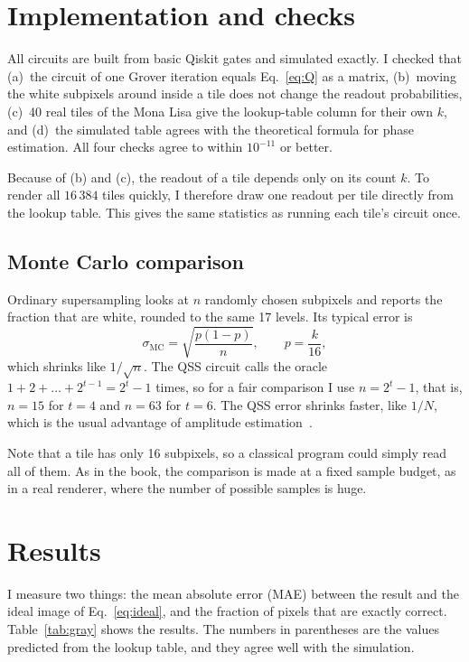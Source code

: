 \documentclass[10pt,twocolumn,a4paper]{article}
\begin{document}
\section{Implementation and checks}\label{sec:impl}

All circuits are built from basic Qiskit gates and simulated exactly.
I checked that
(a)~the circuit of one Grover iteration equals Eq.~\eqref{eq:Q} as a matrix,
(b)~moving the white subpixels around inside a tile does not change the
readout probabilities,
(c)~40 real tiles of the Mona Lisa give the lookup-table column for their own
$k$, and
(d)~the simulated table agrees with the theoretical formula for phase
estimation.
All four checks agree to within $10^{-11}$ or better.

Because of (b) and (c), the readout of a tile depends only on its count $k$.
To render all $16\,384$ tiles quickly, I therefore draw one readout per tile
directly from the lookup table. This gives the same statistics as running each
tile's circuit once.

\subsection{Monte Carlo comparison}
Ordinary supersampling looks at $n$ randomly chosen subpixels and reports the
fraction that are white, rounded to the same 17 levels. Its typical error is
\begin{equation}
\sigma_{\mathrm{MC}}=\sqrt{\frac{p(1-p)}{n}},\qquad p=\frac{k}{16},
\label{eq:mc}
\end{equation}
which shrinks like $1/\sqrt n$. The QSS circuit calls the oracle
$1+2+\dots+2^{t-1}=2^t-1$ times, so for a fair comparison I use $n=2^t-1$, that
is, $n=15$ for $t=4$ and $n=63$ for $t=6$. The QSS error shrinks faster, like
$1/N$, which is the usual advantage of amplitude estimation~\cite{brassard}.

Note that a tile has only 16 subpixels, so a classical program could simply
read all of them. As in the book, the comparison is made at a fixed sample
budget, as in a real renderer, where the number of possible samples is huge.

\section{Results}\label{sec:results}

I measure two things: the mean absolute error (MAE) between the result and the
ideal image of Eq.~\eqref{eq:ideal}, and the fraction of pixels that are
exactly correct. Table~\ref{tab:gray} shows the results. The numbers in
parentheses are the values predicted from the lookup table, and they agree well
with the simulation.
\end{document}
